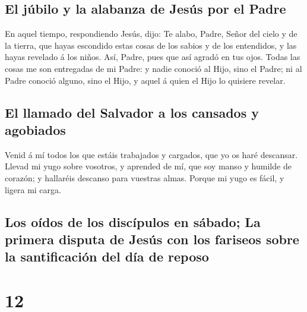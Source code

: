 \hypertarget{el-juxfabilo-y-la-alabanza-de-jesuxfas-por-el-padre}{%
\subsection{El júbilo y la alabanza de Jesús por el
Padre}\label{el-juxfabilo-y-la-alabanza-de-jesuxfas-por-el-padre}}

 En aquel tiempo, respondiendo Jesús, dijo: Te alabo,
Padre, Señor del cielo y de la tierra, que hayas escondido estas cosas
de los sabios y de los entendidos, y las hayas revelado á los niños.
 Así, Padre, pues que así agradó en tus ojos.
 Todas las cosas me son entregadas de mi Padre: y nadie
conoció al Hijo, sino el Padre; ni al Padre conoció alguno, sino el
Hijo, y aquel á quien el Hijo lo quisiere revelar.

\hypertarget{el-llamado-del-salvador-a-los-cansados-y-agobiados}{%
\subsection{El llamado del Salvador a los cansados
\hspace{0pt}\hspace{0pt}y
agobiados}\label{el-llamado-del-salvador-a-los-cansados-y-agobiados}}

 Venid á mí todos los que estáis trabajados y cargados,
que yo os haré descansar.  Llevad mi yugo sobre vosotros,
y aprended de mí, que soy manso y humilde de corazón; y hallaréis
descanso para vuestras almas.  Porque mi yugo es fácil, y
ligera mi carga.

\hypertarget{los-ouxeddos-de-los-discuxedpulos-en-suxe1bado-la-primera-disputa-de-jesuxfas-con-los-fariseos-sobre-la-santificaciuxf3n-del-duxeda-de-reposo}{%
\subsection{Los oídos de los discípulos en sábado; La primera disputa de
Jesús con los fariseos sobre la santificación del día de
reposo}\label{los-ouxeddos-de-los-discuxedpulos-en-suxe1bado-la-primera-disputa-de-jesuxfas-con-los-fariseos-sobre-la-santificaciuxf3n-del-duxeda-de-reposo}}

\hypertarget{section-11}{%
\section{12}\label{section-11}}

